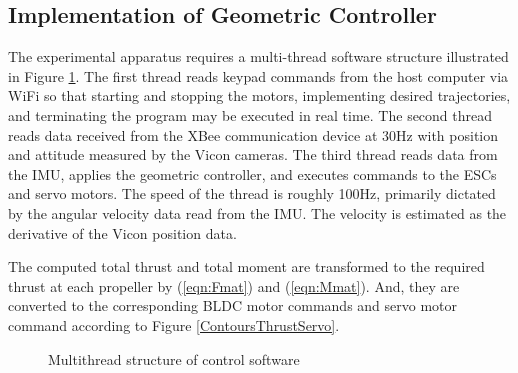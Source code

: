 \documentclass[twocolumn,letterpaper]{IEEEAerospaceCLS}  %
\newcommand{\refeqn}[1]{(\ref{eqn:#1})}
\begin{document}

\subsection{Implementation of Geometric Controller}

The experimental apparatus requires a multi-thread software structure illustrated in Figure \ref{fig:SoftwareSchematic}. The first thread reads keypad commands from the host computer via WiFi so that starting and stopping the motors, implementing desired trajectories, and terminating the program may be executed in real time. The second thread reads data received from the XBee communication device at 30Hz with position and attitude measured by the Vicon cameras. The third thread reads data from the IMU, applies the geometric controller, and executes commands to the ESCs and servo motors. The speed of the thread is roughly 100Hz, primarily dictated by the angular velocity data read from the IMU. The velocity is estimated as the derivative of the Vicon position data. 

The computed total thrust and total moment are transformed to the required thrust at each propeller by \refeqn{Fmat} and \refeqn{Mmat}. And, they are converted to the corresponding BLDC motor commands and servo motor command according to Figure \ref{ContoursThrustServo}.


\begin{figure}
\centerline{
	}
\caption{Multithread structure of control software}
\label{fig:SoftwareSchematic}
\end{figure}
\end{document}
